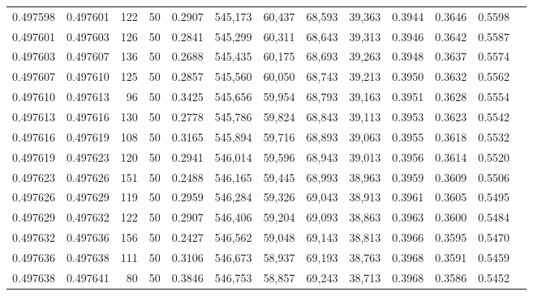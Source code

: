 \begin{tabular}{rrrrrrrrrrrrr}
0.497598 & 0.497601 &   122 &  50 &                                     0.2907 & 545,173 &  60,437 &  68,593 &  39,363 & 0.3944 & 0.3646 & 0.5598 \\
0.497601 & 0.497603 &   126 &  50 &                                     0.2841 & 545,299 &  60,311 &  68,643 &  39,313 & 0.3946 & 0.3642 & 0.5587 \\
0.497603 & 0.497607 &   136 &  50 &                                     0.2688 & 545,435 &  60,175 &  68,693 &  39,263 & 0.3948 & 0.3637 & 0.5574 \\
0.497607 & 0.497610 &   125 &  50 &                                     0.2857 & 545,560 &  60,050 &  68,743 &  39,213 & 0.3950 & 0.3632 & 0.5562 \\
0.497610 & 0.497613 &    96 &  50 &                                     0.3425 & 545,656 &  59,954 &  68,793 &  39,163 & 0.3951 & 0.3628 & 0.5554 \\
0.497613 & 0.497616 &   130 &  50 &                                     0.2778 & 545,786 &  59,824 &  68,843 &  39,113 & 0.3953 & 0.3623 & 0.5542 \\
0.497616 & 0.497619 &   108 &  50 &                                     0.3165 & 545,894 &  59,716 &  68,893 &  39,063 & 0.3955 & 0.3618 & 0.5532 \\
0.497619 & 0.497623 &   120 &  50 &                                     0.2941 & 546,014 &  59,596 &  68,943 &  39,013 & 0.3956 & 0.3614 & 0.5520 \\
0.497623 & 0.497626 &   151 &  50 &                                     0.2488 & 546,165 &  59,445 &  68,993 &  38,963 & 0.3959 & 0.3609 & 0.5506 \\
0.497626 & 0.497629 &   119 &  50 &                                     0.2959 & 546,284 &  59,326 &  69,043 &  38,913 & 0.3961 & 0.3605 & 0.5495 \\
0.497629 & 0.497632 &   122 &  50 &                                     0.2907 & 546,406 &  59,204 &  69,093 &  38,863 & 0.3963 & 0.3600 & 0.5484 \\
0.497632 & 0.497636 &   156 &  50 &                                     0.2427 & 546,562 &  59,048 &  69,143 &  38,813 & 0.3966 & 0.3595 & 0.5470 \\
0.497636 & 0.497638 &   111 &  50 &                                     0.3106 & 546,673 &  58,937 &  69,193 &  38,763 & 0.3968 & 0.3591 & 0.5459 \\
0.497638 & 0.497641 &    80 &  50 &                                     0.3846 & 546,753 &  58,857 &  69,243 &  38,713 & 0.3968 & 0.3586 & 0.5452 \\

\end{tabular}
